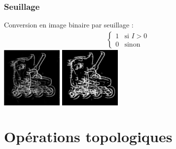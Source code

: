 \documentclass[french]{beamer}
\begin{document}
\begin{frame}
	\frametitle{Seuillage}
	Conversion en image binaire par seuillage :
	\begin{align}
		\begin{cases}
			1 & \text{si } I>0 \\
			0 & \text{sinon}
		\end{cases}
	\end{align}
	\bigskip
	\includegraphics[width=3cm]{images/roller_res.jpg} \; \includegraphics[width=3cm]{images/roller_bin.jpg}
\end{frame}

\section{Opérations topologiques}
\end{document}
